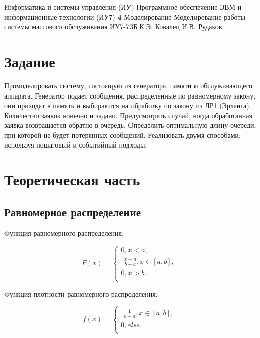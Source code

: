 \documentclass{bmstu}
\begin{document}
\makereporttitle
{Информатика и системы управления (ИУ)}
{Программное обеспечение ЭВМ и информационные технологии (ИУ7)}
{\textbf{4}}
{Моделирование}
{Моделирование работы системы массового обслуживания}
{}
{ИУ7-73Б}
{К.Э. Ковалец}
{И.В. Рудаков}


\setcounter{page}{2}
\renewcommand{\contentsname}{Содержание} 
\tableofcontents

\chapter{Задание}

Промоделировать систему, состоящую из генератора, памяти и обслуживающего аппарата. Генератор подает сообщения, распределенные по равномерному закону, они приходят в память и выбираются на обработку по закону из ЛР1 (Эрланга). Количество заявок конечно и задано. Предусмотреть случай, когда обработанная заявка возвращается обратно в очередь. Определить оптимальную длину очереди, при которой не будет потерянных сообщений. Реализовать двумя способами: используя пошаговый и событийный подходы.



\chapter{Теоретическая часть}

\section{Равномерное распределение}

Функция равномерного распределения:

\begin{equation}
    F(x) =
    \begin{cases}
            0, x < a, \\
            \begin{aligned}
                \frac{x -  a}{b - a}, x \in [a, b], 
            \end{aligned}\\
            0, x > b. \\
    \end{cases}
\end{equation}

Функция плотности равномерного распределения:

\begin{equation}
    f(x) =
    \begin{cases}
            \begin{aligned}
                \frac{1}{b - a}, x \in [a, b], 
            \end{aligned}\\
            0, else. \\
    \end{cases}
\end{equation}
\end{document}
